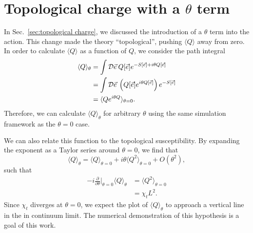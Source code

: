 \section{Topological charge with a $\theta$ term}
\label{sec:topotheta}
In Sec.~\ref{sec:topological charge}, we discussed the introduction of a $\theta$ term into the action. This change made the theory ``topological'', pushing $\langle Q \rangle$ away from zero. In order to calculate $\langle Q \rangle$ as a function of $Q$, we consider the path integral
\begin{align}
    \langle Q \rangle_\theta &=\int \mathcal{D}\vec e\:Q[\vec e]e^{-S[\vec e]+i\theta Q[\vec e]} \\
                             &=\int \mathcal{D}\vec e\:\left( Q[\vec e]e^{i\theta Q[\vec e]} \right) e^{-S[\vec e]} \\
                             &=\langle Q e^{i \theta Q} \rangle_{\theta=0}.
\end{align}
Therefore, we can calculate $\langle Q \rangle_\theta$ for arbitrary $\theta$ using the same simulation framework as the $\theta=0$ case.

We can also relate this function to the topological susceptibility. By expanding the exponent as a Taylor series around $\theta=0$, we find that  
\begin{equation}
    \langle Q \rangle_\theta = \langle Q \rangle_{\theta=0} + i \theta \langle Q^2 \rangle_{\theta=0} + O(\theta^2),
\end{equation}
such that 
\begin{align}
    -i \frac{\partial}{\partial \theta}\Big|_{\theta=0} \langle Q \rangle_\theta &= \langle Q^2 \rangle_{\theta=0}\\
                                                              &= \chi_t L^2.
\end{align}
Since $\chi_t$ diverges at $\theta=0$, we expect the plot of $\langle Q\rangle_\theta$ to approach a vertical line in the in continuum limit. The numerical demonstration of this hypothesis is a goal of this work.

